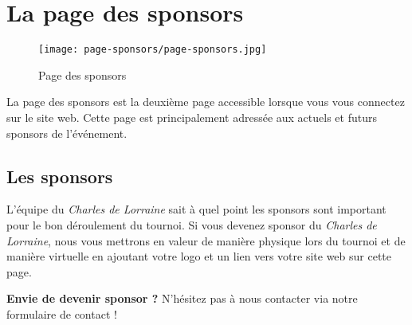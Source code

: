 \section{La page des sponsors}

\begin{figure}[H]
\centering
\texttt{[image: page-sponsors/page-sponsors.jpg]}
\caption{Page des sponsors}
\end{figure}

La page des sponsors est la deuxième page accessible lorsque vous vous connectez sur le site web. Cette page est principalement adressée aux actuels et futurs sponsors de l'événement.

\subsection{Les sponsors}

L'équipe du \textit{Charles de Lorraine} sait à quel point les sponsors sont important
pour le bon déroulement du tournoi. Si vous devenez sponsor du \textit{Charles de
Lorraine}, nous vous mettrons en valeur de manière physique lors du tournoi et
de manière virtuelle en ajoutant votre logo et un lien vers votre site web sur
cette page. \newline

\textbf{Envie de devenir sponsor ?} N'hésitez pas à nous contacter via notre
formulaire de contact ! \newline

